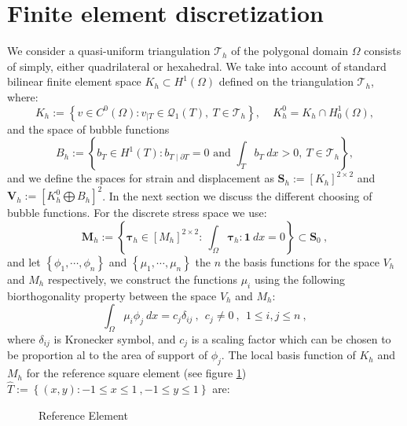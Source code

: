 \documentclass[preprint,12pt,authoryear]{elsarticle}
\begin{document}
\section{Finite element discretization}
We consider a quasi-uniform triangulation $\mathcal{T}_{h}$ of the polygonal domain $\Omega$ consists of simply, either quadrilateral or hexahedral.
We take into account of standard bilinear finite element space $K_{h}\subset H^{1}(\Omega)$ defined on the triangulation $\mathcal{T}_{h}$, where:
\begin{equation}
K_{h} := \left\lbrace v \in C^{0}(\Omega): v_{\mid T}\in \mathcal{Q}_{1}(T), \: T\in \mathcal{T}_{h} \right\rbrace ,
\:\:\:\:\: K_{h}^{0} = K_{h} \cap H_{0}^{1}(\Omega) ,
\end{equation} 
and the space of bubble functions
\begin{equation}
B_{h} := \left\lbrace b_{T}\in H^{1}(T): b_{T\mid \partial T}=0 
\mbox{ and } \int_{T} b_{T} \: dx > 0, \: T\in \mathcal{T}_{h} 
\right\rbrace ,
\end{equation}
and we define the spaces for strain and displacement as $\bm{S}_{h}:=[K_{h}]^{2\times 2}$ and $\bm{V}_{h}:=\left[K_{h}^{0} \bigoplus B_{h}\right]^{2}$. 
In the next section we discuss the different choosing of bubble functions.
For the discrete stress space we use:
\begin{equation}
\bm{M}_{h}:=\left\lbrace \bm{\tau}_{h}\in \left[M_{h}\right]^{2\times 2}: \: \int_{\Omega} \bm{\tau}_{h} : \bm{1} \: dx = 0 \right\rbrace \subset \bm{S}_{0}\:,
\end{equation}
and let $\left\lbrace \phi_{1}, \cdots, \phi_{n}\right\rbrace$ and 
$\left\lbrace \mu_{1}, \cdots, \mu_{n}\right\rbrace$ the $n$ the basis functions for the space $V_{h}$ and $M_{h}$ respectively, we construct the functions $\mu_{i}$ using the following biorthogonality property between the space $V_{h}$ and $M_{h}$:
\begin{equation}
\int_{\Omega}\mu_{i}\phi_{j} \: dx = c_{j}\delta_{ij}\:, \:\: c_{j}\neq 0\:,
\:\: 1 \leq i,j \leq n \:,
\end{equation}
where $\delta_{ij}$ is Kronecker symbol, and $c_{j}$ is a scaling factor which can be chosen to be proportion al to the area of support of $\phi_{j}$.
The local basis function of $K_{h}$ and $M_{h}$ for the reference square element (see figure \ref{fig:ref_element}) $\hat{T}:=\left\lbrace (x,y): -1\leq x \leq 1 \:, -1\leq y \leq 1 \right\rbrace$ are:
\begin{figure}[h!]
\begin{center}

\caption{Reference Element \label{fig:ref_element}}
\end{center}
\end{figure}
\end{document}
